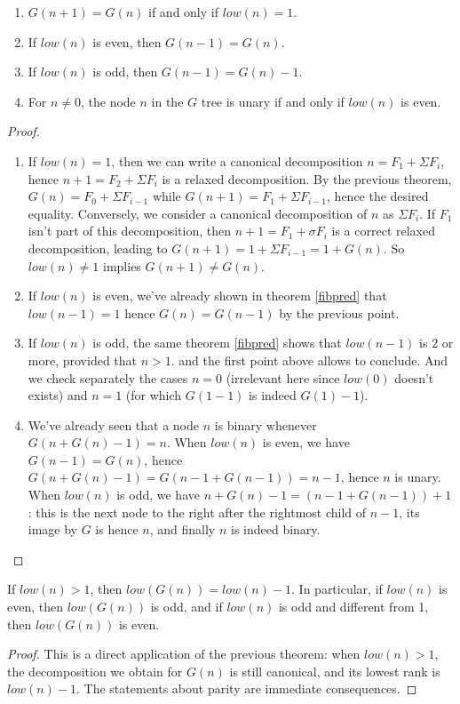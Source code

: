 \documentclass[a4paper,11pt]{article}
\begin{document}
\begin{theorem}\label{Gclass1}
\noindent
\begin{enumerate}
\item $G(n+1)=G(n)$ if and only if $low(n)=1$.
\item If $low(n)$ is even, then $G(n-1)=G(n)$.
\item If $low(n)$ is odd, then $G(n-1)=G(n)-1$.
\item For $n\neq 0$, the node $n$ in the $G$ tree
 is unary if and only if $low(n)$ is even.
\end{enumerate}
\end{theorem}
\begin{proof}
\noindent
\begin{enumerate}
\item
If $low(n)=1$, then we can write a canonical decomposition
$n=F_1+\Sigma F_i$, hence
$n+1=F_2+\Sigma F_i$ is a relaxed decomposition. By the previous
theorem, $G(n) = F_0 + \Sigma F_{i-1}$ while
$G(n+1) = F_1 + \Sigma F_{i-1}$, hence the desired equality.
Conversely, we consider a canonical decomposition of $n$ as $\Sigma F_i$.
If $F_1$ isn't part of this decomposition, then $n+1=F_1+\sigma F_i$
is a correct relaxed decomposition, leading to
$G(n+1)=1+\Sigma F_{i-1}=1+G(n)$. So $low(n)\neq 1$ implies
$G(n+1)\neq G(n)$.

\item If $low(n)$ is even, we've already shown in theorem \ref{fibpred}
  that $low(n-1)=1$ hence $G(n)=G(n-1)$ by the previous point.

\item If $low(n)$ is odd, the same theorem
 \ref{fibpred} shows that $low(n-1)$ is 2 or more, provided that $n>1$.
 and the first point above allows to conclude. And we check separately
 the cases $n=0$ (irrelevant here since $low(0)$ doesn't exists) and
 $n=1$ (for which $G(1-1)$ is indeed $G(1)-1$).

\item We've already seen that a node $n$ is binary whenever 
$G(n+G(n)-1) = n$. When $low(n)$ is even, we have
$G(n-1)=G(n)$, hence $G(n+G(n)-1) = G(n-1+G(n-1)) = n-1$, hence $n$ is
  unary. When $low(n)$ is odd, we have
$n+G(n)-1 = (n-1+G(n-1))+1$ : this is the next node to the right after
the rightmost child of $n-1$, its image by $G$ is hence $n$, and
finally $n$ is indeed binary.
\end{enumerate}
\end{proof}


\begin{theorem}\label{Glow}
If $low(n)>1$, then $low(G(n))=low(n)-1$. In particular,
if $low(n)$ is even, then $low(G(n))$ is odd, and if $low(n)$
is odd and different from 1, then $low(G(n))$ is even.
\end{theorem}
\begin{proof}
This is a direct application of the previous theorem:
when $low(n)>1$, the decomposition we obtain for $G(n)$ is
still canonical, and its lowest rank is $low(n)-1$.
The statements about parity are immediate consequences.
\end{proof}
\end{document}
